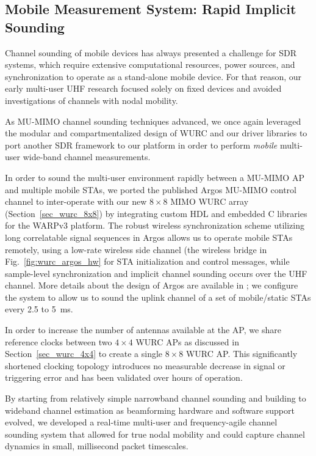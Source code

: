 	
	
\subsection{Mobile Measurement System: Rapid Implicit Sounding}
\label{sec_mobile_chan_est}

 Channel sounding of mobile devices has always presented a challenge for \ac{SDR} systems, which require extensive computational resources, power sources, and  synchronization to operate as a stand-alone mobile device.
 For that reason, our early multi-user UHF research focused solely on fixed devices \cite{anand2014case} and avoided investigations of channels with nodal mobility.

	As \ac{MU-MIMO} channel sounding techniques advanced, we once again leveraged the modular and compartmentalized design of \ac{WURC} and our driver libraries to port another \ac{SDR} framework to our platform in order to perform \emph{mobile} multi-user wide-band channel measurements.

 In order to sound the multi-user environment rapidly between a \ac{MU-MIMO} \ac{AP} and multiple mobile \acp{STA}, we ported the published Argos \ac{MU-MIMO} control channel \cite{shepard2015faros} to inter-operate with our new $8\times 8$ MIMO WURC array (Section~\ref{sec_wurc_8x8}) by integrating custom HDL and embedded C libraries for the WARPv3 platform. 
 The robust wireless synchronization scheme utilizing long correlatable signal sequences in Argos allows us to operate mobile \acp{STA} remotely, using a low-rate wireless side channel (the wireless bridge in Fig.~\ref{fig:wurc_argos_hw} for \ac{STA} initialization and control messages, while sample-level synchronization and implicit channel sounding occurs over the UHF channel.
 More details about the design of Argos are available in \cite{shepard2015faros}; we configure the system to allow us to sound the uplink channel of a set of mobile/static \acp{STA} every 2.5 to 5~ms.

	In order to increase the number of antennas available at the \ac{AP}, we share reference clocks between two $4\times4$ WURC \acp{AP} as discussed in Section~\ref{sec_wurc_4x4} to create a single $8\times8$ \ac{WURC} \ac{AP}.
	This significantly shortened clocking topology introduces no measurable decrease in signal or triggering error and has been validated over hours of operation. %
	
	By starting from relatively simple narrowband channel sounding and building to wideband channel estimation as beamforming hardware and software support evolved, we developed a real-time multi-user and frequency-agile channel sounding system that allowed for true nodal mobility and could capture channel dynamics in small, millisecond packet timescales.
